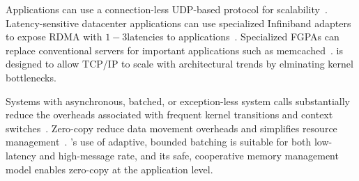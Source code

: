 Applications can use a connection-less UDP-based protocol for
scalability~\cite{nishtala2013scaling}.  Latency-sensitive datacenter
applications can use specialized Infiniband adapters to expose RDMA
with $1-3$\microsecond latencies to
applications~\cite{DBLP:conf/sosp/OngaroRSOR11,Jose:2011:MDH,mitchell:rdma,dragojevic14farm}.
Specialized FGPAs can replace conventional servers for important
applications such as
memcached~\cite{DBLP:conf/fpga/ChalamalasettiLWARM13}.  \ix is
designed to allow TCP/IP to scale with architectural trends by
elminating kernel bottlenecks.


Systems with asynchronous, batched, or exception-less system calls
substantially reduce the overheads associated with frequent kernel
transitions and context switches~\cite{
  soares2010flexsc,han2012megapipe,rizzo2012netmap,jeong2014mtcp}.
Zero-copy reduce data movement overheads and simplifies resource
management~\cite{DBLP:journals/tocs/PaiDZ00}.  \ix's use of adaptive,
bounded batching is suitable for both low-latency and high-message
rate, and its safe, cooperative memory management model enables
zero-copy at the application level.



